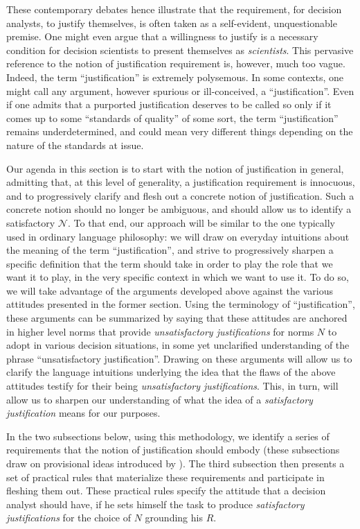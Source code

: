 \documentclass[preprint, french, english, 11pt, authoryear]{elsarticle}%
\newcommand{\adv}{\mathscr{N}}
\begin{document}
These contemporary debates hence illustrate that the requirement, for decision analysts, to justify themselves, is often taken as a self-evident, unquestionable premise. One might even argue that a willingness to justify is a necessary condition for decision scientists to present themselves as \emph{scientists}. This pervasive reference to the notion of justification requirement is, however, much too vague. Indeed, the term ``justification'' is extremely polysemous. In some contexts, one might call any argument, however spurious or ill-conceived, a ``justification''. Even if one admits that a purported justification deserves to be called so only if it comes up to some ``standards of quality'' of some sort, the term ``justification'' remains underdetermined, and could mean very different things depending on the nature of the standards at issue.

Our agenda in this section is to start with the notion of justification in general, admitting that, at this level of generality, a justification requirement is innocuous, and to progressively clarify and flesh out a concrete notion of justification. Such a concrete notion should no longer be ambiguous, and should allow us to identify a satisfactory $\adv$. To that end, our approach will be similar to the one typically used in ordinary language philosophy: we will draw on everyday intuitions about the meaning of the term ``justification'', and strive to progressively sharpen a specific definition that the term should take in order to play the role that we want it to play, in the very specific context in which we want to use it. To do so, we will take advantage of the arguments developed above against the various attitudes presented in the former section. Using the terminology of ``justification'', these arguments can be summarized by saying that these attitudes are anchored in higher level norms that provide \emph{unsatisfactory justifications} for norms $N$ to adopt in various decision situations, in some yet unclarified understanding of the phrase ``unsatisfactory justification''. Drawing on these arguments will allow us to clarify the language intuitions underlying the idea that the flaws of the above attitudes testify for their being \emph{unsatisfactory justifications}. This, in turn, will allow us to sharpen our understanding of what the idea of a \emph{satisfactory justification} means for our purposes.

In the two subsections below, using this methodology, we identify a series of requirements that the notion of justification should embody (these subsections draw on provisional ideas introduced by \citet{meinard_du_2013, meinard_what_2017}). The third subsection then presents a set of practical rules that materialize these requirements and participate in fleshing them out. These practical rules specify the attitude that a decision analyst should have, if he sets himself the task to produce \emph{satisfactory justifications} for the choice of $N$ grounding his $R$.
\end{document}
